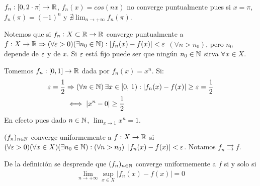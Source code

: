 \begin{eg}
  \(f_n: [0, 2 \cdot \pi] \to \mathbb{R} \), \(f_n(x) = cos(nx)\) no converge puntualmente pues si \(x = \pi\), \(f_n(\pi) = (-1)^n\) y \(\nexists \lim_{n \to +\infty} f_n(\pi)\).
\end{eg}

Notemos que si \(f_n: X \subset \mathbb{R} \to \mathbb{R} \) converge puntualmente a \(f: X \to \mathbb{R} \Rightarrow (\forall \varepsilon > 0)(\exists n_0 \in \mathbb{N}) : |f_n(x) - f(x)| < \varepsilon \) \((\forall n > n_0)\), pero \(n_0\) depende de \(\varepsilon \) y de \(x\). Si \(\varepsilon \) está fijo puede ser que ningún \(n_0 \in \mathbb{N} \) sirva \(\forall x \in X\).

\begin{eg}
  Tomemos \(f_n: [0, 1] \to \mathbb{R} \) dada por \(f_n(x) = x^n\). Si: \begin{align*}
    \varepsilon = \frac{1}{2} & \Rightarrow (\forall n \in \mathbb{N}) \, \exists x \in [0\text{, }1) : |f_n(x) - f(x)| \geq \varepsilon = \frac{1}{2} \\
                     & \iff |x^n - 0| \geq \frac{1}{2}
  \end{align*}
  En efecto pues dado \(n \in \mathbb{N} \), \(\lim_{x \to 1} x^n = 1\).
\end{eg}

\begin{definition}
  \((f_n)_{n \in \mathbb{N}} \) converge uniformemente a \(f: X \to \mathbb{R} \) si \((\forall \varepsilon > 0)(\forall x \in X)(\exists n_0 \in \mathbb{N}) : (\forall n > n_0)\) \(|f_n(x) - f(x)| < \varepsilon \). Notamos \(f_n \rightrightarrows f\).
\end{definition}

De la definición se desprende que \((f_n)_{n \in \mathbb{N}} \) converge uniformemente a \(f\) si y solo si \begin{align*}
  \lim_{n \to +\infty} \sup_{x \in X} |f_n(x) - f(x)| = 0
\end{align*}

